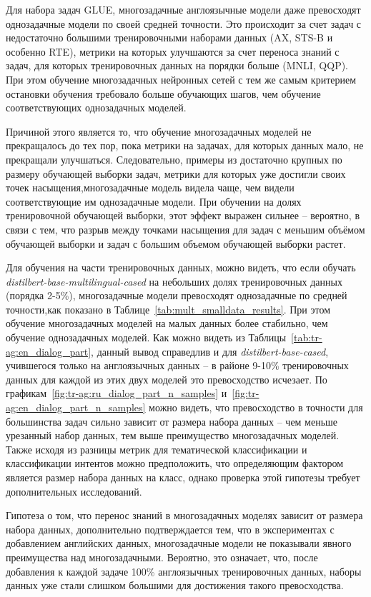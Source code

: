 Для набора задач GLUE, многозадачные англоязычные модели даже превосходят однозадачные модели по своей средней точности. Это происходит за счет задач с недостаточно большими тренировочными наборами данных (AX, STS-B и особенно RTE), метрики на которых улучшаются за счет переноса знаний с задач, для которых тренировочных данных на порядки больше (MNLI, QQP).
При этом обучение многозадачных нейронных сетей с тем же самым критерием остановки обучения требовало больше обучающих шагов, чем обучение соответствующих однозадачных моделей.

Причиной этого является то, что обучение многозадачных моделей не прекращалось до тех пор, пока метрики на задачах, для которых данных мало, не прекращали улучшаться.
Следовательно, примеры из достаточно крупных по размеру обучающей выборки задач, метрики для которых уже достигли своих точек насыщения,многозадачные модель видела чаще, чем видели соответствующие им однозадачные модели. При обучении на долях тренировочной обучающей выборки, этот эффект выражен сильнее -- вероятно, в связи с тем, что разрыв между точками насыщения для задач с меньшим объёмом обучающей выборки и задач с большим объемом обучающей выборки растет.

Для обучения на части тренировочных данных, можно видеть, что если обучать \textit{distilbert-base-multilingual-cased} на небольших долях тренировочных данных (порядка 2-5\%), многозадачные модели превосходят однозадачные по средней точности,как показано в Таблице~\ref{tab:mult_smalldata_results}. При этом обучение многозадачных моделей на малых данных более стабильно, чем обучение однозадачных моделей. Как можно видеть из Таблицы~\ref{tab:tr-ag:en_dialog_part}, данный вывод справедлив и для \textit{distilbert-base-cased}, учившегося только на англоязычных данных -- в районе 9-10\% тренировочных данных для каждой из этих двух моделей это превосходство исчезает.  По графикам~\ref{fig:tr-ag:ru_dialog_part_n_samples} и~\ref{fig:tr-ag:en_dialog_part_n_samples} можно видеть, что превосходство в точности для большинства задач сильно зависит от размера набора данных -- чем меньше урезанный набор данных, тем выше преимущество многозадачных моделей. Также исходя из разницы метрик для тематической классификации и классификации интентов можно предположить, что определяющим фактором является размер набора данных на класс, однако проверка этой гипотезы требует дополнительных исследований. 

Гипотеза о том, что перенос знаний в многозадачных моделях зависит от размера набора данных, дополнительно подтверждается тем, что в экспериментах с добавлением английских данных, многозадачные модели не показывали явного преимущества над многозадачными. Вероятно, это означает, что, после добавления к каждой задаче 100\% англоязычных тренировочных данных, наборы данных уже стали слишком большими для достижения такого превосходства.

